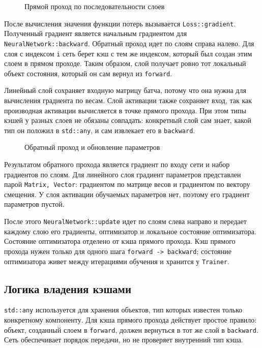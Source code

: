 \documentclass{article}
\begin{document}
\begin{figure}[!t]
    \centering
    
    \caption{Прямой проход по последовательности слоев}
    \label{fig:forward}
\end{figure}

После вычисления значения функции потерь вызывается
\texttt{Loss::gradient}. Полученный градиент является начальным
градиентом для \texttt{NeuralNetwork::backward}. Обратный проход идет
по слоям справа налево. Для слоя с индексом \texttt{i} сеть берет
кэш с тем же индексом, который был создан этим слоем в прямом проходе.
Таким образом, слой получает ровно тот локальный объект состояния,
который он сам вернул из \texttt{forward}.

Линейный слой сохраняет входную матрицу батча, потому что она нужна
для вычисления градиента по весам. Слой активации также сохраняет
вход, так как производная активации вычисляется в точке прямого
прохода. При этом типы кэшей у разных слоев не обязаны совпадать:
конкретный слой сам знает, какой тип он положил в \texttt{std::any},
и сам извлекает его в \texttt{backward}.

\begin{figure}[!t]
    \centering
    
    \caption{Обратный проход и обновление параметров}
    \label{fig:backward}
\end{figure}

Результатом обратного прохода является градиент по входу сети и набор
градиентов по слоям. Для линейного слоя градиент параметров
представлен парой \texttt{Matrix, Vector}: градиентом по матрице
весов и градиентом по вектору смещения. У слоя активации обучаемых
параметров нет, поэтому его градиент параметров пустой.

После этого \texttt{NeuralNetwork::update} идет по слоям слева направо
и передает каждому слою его градиенты, оптимизатор и локальное
состояние оптимизатора. Состояние оптимизатора отделено от кэша
прямого прохода. Кэш прямого прохода нужен только для одного шага
\texttt{forward -> backward}; состояние оптимизатора живет между
итерациями обучения и хранится у \texttt{Trainer}.

\subsection{Логика владения кэшами}

\texttt{std::any} используется для хранения объектов, тип которых
известен только конкретному компоненту. Для кэша прямого прохода
действует простое правило: объект, созданный слоем в \texttt{forward},
должен вернуться в тот же слой в \texttt{backward}. Сеть обеспечивает
порядок передачи, но не проверяет внутренний тип кэша.
\end{document}
